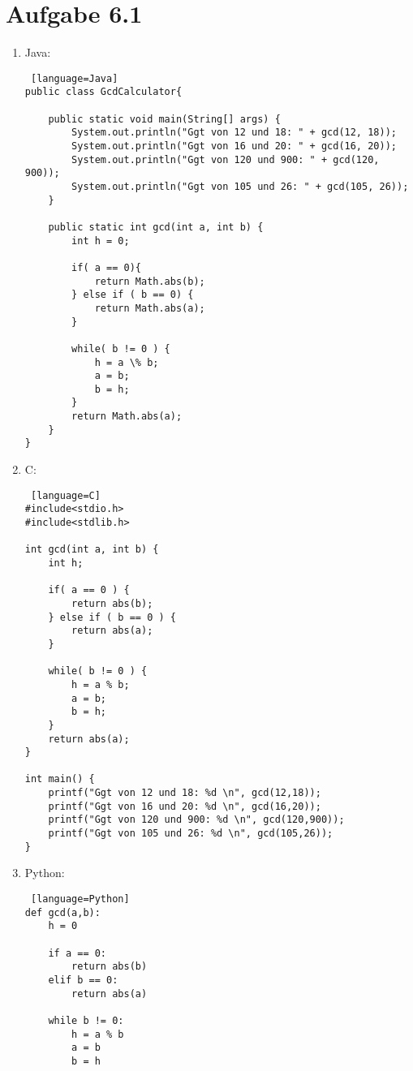 \documentclass[a4paper,11pt]{scrartcl}
\renewcommand{\labelenumi}{(\roman{enumi})}
\begin{document}
    \section*{Aufgabe 6.1}
    \renewcommand{\labelenumi}{\alph{enumi})}
		\begin{enumerate}
            \item Java:
\begin{lstlisting} [language=Java]
public class GcdCalculator{

    public static void main(String[] args) {
        System.out.println("Ggt von 12 und 18: " + gcd(12, 18));
        System.out.println("Ggt von 16 und 20: " + gcd(16, 20));
        System.out.println("Ggt von 120 und 900: " + gcd(120, 900));
        System.out.println("Ggt von 105 und 26: " + gcd(105, 26));
    }

    public static int gcd(int a, int b) {
        int h = 0; 

        if( a == 0){
            return Math.abs(b);
        } else if ( b == 0) {
            return Math.abs(a);
        }

        while( b != 0 ) {
            h = a \% b;
            a = b;
            b = h;
        }
        return Math.abs(a);
    }
}
\end{lstlisting}
            \item C:
\begin{lstlisting} [language=C]
#include<stdio.h>
#include<stdlib.h>

int gcd(int a, int b) {
    int h;

    if( a == 0 ) {
        return abs(b);
    } else if ( b == 0 ) {
        return abs(a);
    }

    while( b != 0 ) {
        h = a % b;
        a = b;
        b = h;
    }
    return abs(a);
}

int main() {
    printf("Ggt von 12 und 18: %d \n", gcd(12,18));
    printf("Ggt von 16 und 20: %d \n", gcd(16,20));
    printf("Ggt von 120 und 900: %d \n", gcd(120,900));
    printf("Ggt von 105 und 26: %d \n", gcd(105,26));
}
\end{lstlisting}
\newpage
            \item Python:
\begin{lstlisting} [language=Python]
def gcd(a,b):
    h = 0

    if a == 0:
        return abs(b)
    elif b == 0:
        return abs(a)

    while b != 0:
        h = a % b
        a = b
        b = h


\end{lstlisting}
\end{enumerate}
\end{document}
